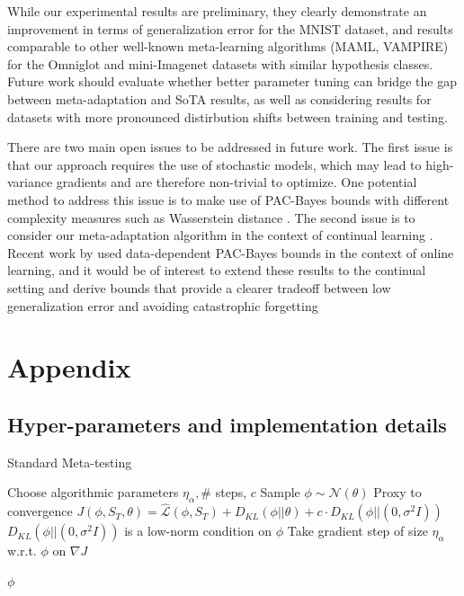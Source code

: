 \documentclass{article} %
\theoremstyle{definition}
\begin{document}
While our experimental results are preliminary, they clearly demonstrate an improvement in terms of generalization error for the MNIST dataset, and results comparable to other well-known meta-learning algorithms (MAML, VAMPIRE) for the Omniglot and mini-Imagenet datasets with similar hypothesis classes. Future work should evaluate whether better parameter tuning can bridge the gap between meta-adaptation and SoTA results, as well as considering results for datasets with more pronounced distirbution shifts between training and testing.

There are two main open issues to be addressed in future work. 
The first issue is that our approach requires the use of stochastic models, which may lead to high-variance gradients and are therefore non-trivial to optimize. One potential method to address this issue is to make use of PAC-Bayes bounds with different complexity measures such as Wasserstein distance \citep{Ohnishi2021, Amit2022}.
The second issue is to consider our meta-adaptation algorithm in the context of continual learning \citep{Kirkpatrick2017}. Recent work by \citet{Haddouche2022} used data-dependent PAC-Bayes bounds in the context of online learning, and it would be of interest to extend these results to the continual setting and derive bounds that provide a clearer tradeoff between low generalization error and avoiding catastrophic forgetting

%



\clearpage
\appendix 
\section{Appendix}
\label{sec:appendix}

\subsection{Hyper-parameters and implementation details} \label{append:hyper-params}

\begin{algorithm}[H]
	\caption{Standard Meta-testing}
	\small
	\begin{algorithmic}
		\State Choose algorithmic parameters $\eta_\alpha, \#$ steps, $c$
		\State Sample $\phi\sim \mathcal{N}(\theta)$
		 \Comment Proxy to convergence
			\State $J(\phi, S_T,\theta)=\hat{\mathcal{L}}(\phi, S_T) + D_{KL}(\phi||\theta) + c\cdot D_{KL}(\phi||(0,\sigma^2 I))$ \Comment $D_{KL}(\phi||(0,\sigma^2 I))$ is a low-norm condition on $\phi$
			\State  Take gradient step of size $\eta_\alpha$ w.r.t.\! $\phi$ on $\nabla J$

		\EndWhile
		\State \Return $\phi$
		\EndFunction
	\end{algorithmic}
\end{algorithm}
\end{document}
